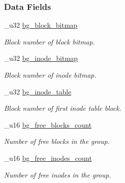 \subsubsection*{Data Fields}
\begin{CompactItemize}
\item 
\hypertarget{structgroup__desc__t_m0}{
\_\-u32 \hyperlink{structgroup__desc__t_m0}{bg\_\-block\_\-bitmap}}
\label{structgroup__desc__t_m0}

\begin{CompactList}\small\item\em Block number of block bitmap.\item\end{CompactList}\item 
\hypertarget{structgroup__desc__t_m1}{
\_\-u32 \hyperlink{structgroup__desc__t_m1}{bg\_\-inode\_\-bitmap}}
\label{structgroup__desc__t_m1}

\begin{CompactList}\small\item\em Block number of inode bitmap.\item\end{CompactList}\item 
\hypertarget{structgroup__desc__t_m2}{
\_\-u32 \hyperlink{structgroup__desc__t_m2}{bg\_\-inode\_\-table}}
\label{structgroup__desc__t_m2}

\begin{CompactList}\small\item\em Block number of first inode table block.\item\end{CompactList}\item 
\hypertarget{structgroup__desc__t_m3}{
\_\-u16 \hyperlink{structgroup__desc__t_m3}{bg\_\-free\_\-blocks\_\-count}}
\label{structgroup__desc__t_m3}

\begin{CompactList}\small\item\em Number of free blocks in the group.\item\end{CompactList}\item 
\hypertarget{structgroup__desc__t_m4}{
\_\-u16 \hyperlink{structgroup__desc__t_m4}{bg\_\-free\_\-inodes\_\-count}}
\label{structgroup__desc__t_m4}

\begin{CompactList}\small\item\em Number of free inodes in the group.\item\end{CompactList}\end{CompactItemize}
